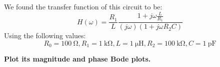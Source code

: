 

\begin{center}

\end{center}
  
We found the transfer function of this circuit to be:
$$H(\omega) = \frac{R_1}{L} \frac{1 + j\omega \frac{L}{R_1}}{(j\omega)(1 + j\omega R_2 C)}$$
Using the following values:
$$R_0 = \SI{100}{\ohm}, R_1 = \SI{1}{\kilo\ohm}, L = \SI{1}{\micro\henry}, R_2 = \SI{100}{\kilo\ohm}, C = \SI{1}{\pico\farad}$$

\textbf{Plot its magnitude and phase Bode plots.}

